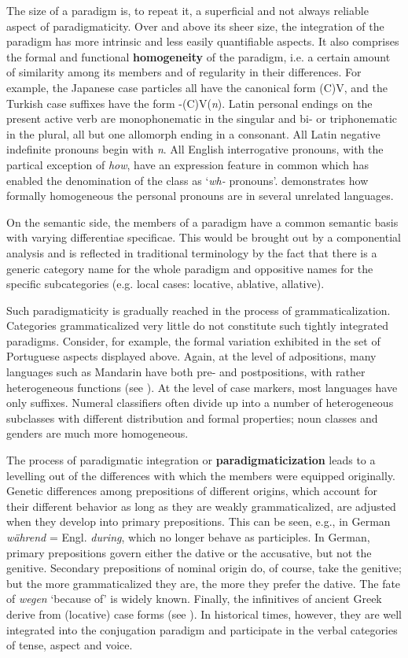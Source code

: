The size of a paradigm is, to repeat it, a superficial and not always reliable aspect of paradigmaticity. Over and above its sheer size, the integration of the paradigm has more intrinsic and less easily quantifiable aspects. It also comprises the formal and functional \textbf{homogeneity} of the paradigm, i.e. a certain amount of similarity among its members and of regularity in their differences. For example, the Japanese case particles all have the canonical form (C)V, and the Turkish case suffixes have the form -(C)V(\textit{n}). Latin personal endings on the present active verb are monophonematic in the singular and bi- or triphonematic in the plural, all but one allomorph ending in a consonant. All Latin negative indefinite pronouns begin with \textit{n}. All English interrogative pronouns, with the partical exception of \textit{how}, have an expression feature in common which has enabled the denomination of the class as ‘\textit{wh-} pronouns’. \citet[256f ]{Bloomfield1933} demonstrates how formally homogeneous the personal pronouns are in several unrelated languages.

On the semantic side, the members of a paradigm have a common semantic basis with varying differentiae specificae. This would be brought out by a componential analysis and is reflected in traditional terminology by the fact that there is a generic category name for the whole paradigm and oppositive names for the specific subcategories (e.g. local cases: locative, ablative, allative).

Such paradigmaticity is gradually reached in the process of grammaticalization. Categories grammaticalized very little do not constitute such tightly integrated paradigms. Consider, for example, the formal variation exhibited in the set of Portuguese aspects displayed above. Again, at the level of adpositions, many languages such as Mandarin have both pre- and postpositions, with rather heterogeneous functions (see \citet{Hagège1975}). At the level of case markers, most languages have only suffixes. Numeral classifiers often divide up into a number of heterogeneous subclasses with different distribution and formal properties; noun classes and genders are much more homogeneous.

The process of paradigmatic integration or \textbf{paradigmaticization} leads to a levelling out of the differences with which the members were equipped originally. Genetic differences among prepositions of different origins, which account for their different behavior as long as they are weakly grammaticalized, are adjusted when they develop into primary prepositions. This can be seen, e.g., in German \textit{während} = Engl. \textit{during}, which no longer behave as participles. In German, primary prepositions govern either the dative or the accusative, but not the genitive. Secondary prepositions of nominal origin do, of course, take the genitive; but the more grammaticalized they are, the more they prefer the dative. The fate of \textit{wegen} ‘because of’ is widely known. Finally, the infinitives of ancient Greek derive from (locative) case forms (see \citet[196f, 237-239]{Rix1976} ). In historical times, however, they are well integrated into the conjugation paradigm and participate in the verbal categories of tense, aspect and voice.


